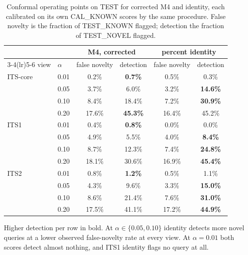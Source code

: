 \begin{table}[htbp]\centering
\begin{threeparttable}
\caption{Conformal operating points on TEST for corrected M4 and identity, each calibrated on its own CAL\_KNOWN scores by the same procedure. False novelty is the fraction of TEST\_KNOWN flagged; detection the fraction of TEST\_NOVEL flagged.}
\label{tab:operating}
\small
\begin{tabular}{llcccc}
\toprule
 & & \multicolumn{2}{c}{M4, corrected} & \multicolumn{2}{c}{percent identity} \\
\cmidrule(lr){3-4}\cmidrule(lr){5-6}
view & $\alpha$ & false novelty & detection & false novelty & detection \\
\midrule
ITS-core & 0.01 & 0.2\% & \textbf{0.7\%} & 0.5\% & 0.3\% \\
 & 0.05 & 3.7\% & 6.0\% & 3.2\% & \textbf{14.6\%} \\
 & 0.10 & 8.4\% & 18.4\% & 7.2\% & \textbf{30.9\%} \\
 & 0.20 & 17.6\% & \textbf{45.3\%} & 16.4\% & 45.2\% \\
\addlinespace
ITS1 & 0.01 & 0.4\% & \textbf{0.8\%} & 0.0\% & 0.0\% \\
 & 0.05 & 4.9\% & 5.5\% & 4.0\% & \textbf{8.4\%} \\
 & 0.10 & 8.7\% & 12.3\% & 7.4\% & \textbf{24.8\%} \\
 & 0.20 & 18.1\% & 30.6\% & 16.9\% & \textbf{45.4\%} \\
\addlinespace
ITS2 & 0.01 & 0.8\% & \textbf{1.2\%} & 0.5\% & 1.1\% \\
 & 0.05 & 4.3\% & 9.6\% & 3.3\% & \textbf{15.0\%} \\
 & 0.10 & 8.6\% & 21.4\% & 7.6\% & \textbf{31.0\%} \\
 & 0.20 & 17.5\% & 41.1\% & 17.2\% & \textbf{44.9\%} \\
\bottomrule
\end{tabular}
\begin{tablenotes}\footnotesize
\item Higher detection per row in bold. At $\alpha\in\{0.05,0.10\}$ identity detects more novel queries at a lower observed false-novelty rate at every view. At $\alpha=0.01$ both scores detect almost nothing, and ITS1 identity flags no query at all.
\end{tablenotes}
\end{threeparttable}
\end{table}
